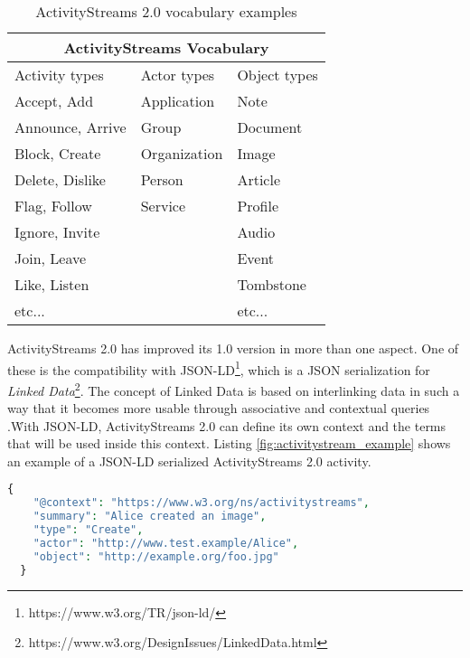 \begin{table}[H]
  \centering
  \begin{tabular}{|p{4cm}|p{4cm}|p{4cm}| }
    \hline
    \multicolumn{3}{|c|}{ActivityStreams Vocabulary} \\
    \hline
    Activity types & Actor types & Object types \\
    \hline
    \hline
      Accept, Add & Application & Note \\
      Announce, Arrive & Group & Document \\ 
      Block, Create & Organization & Image \\
      Delete, Dislike & Person & Article \\
      Flag, Follow & Service & Profile \\
      Ignore, Invite & & Audio \\
      Join, Leave & & Event \\
      Like, Listen & & Tombstone \\
      etc... & & etc... \\
      \hline
  \end{tabular}
  \caption{ActivityStreams 2.0 vocabulary examples}
  \label{table:activitystreams_vocabulary}
\end{table}

ActivityStreams 2.0 has improved its 1.0 version in more than one aspect. One of these is the compatibility with JSON-LD\footnote{https://www.w3.org/TR/json-ld/}, which is a JSON serialization for \emph{Linked Data}\footnote{https://www.w3.org/DesignIssues/LinkedData.html}. The concept of Linked Data is based on interlinking data in such a way that it becomes more usable through associative and contextual queries \cite{berners-lee_2006}.\. With JSON-LD, ActivityStreams 2.0 can define its own context and the terms that will be used inside this context. Listing \ref{fig:activitystream_example} shows an example of a JSON-LD serialized ActivityStreams 2.0 activity. 

\lstset{style=JSONStyle}
\begin{lstlisting}[language=PHP, caption=Example of a Create activity using JSON-LD \cite{snell_prodromou_2017}, label=fig:activitystream_example, float=h]
  {
    "@context": "https://www.w3.org/ns/activitystreams",
    "summary": "Alice created an image",
    "type": "Create",
    "actor": "http://www.test.example/Alice",
    "object": "http://example.org/foo.jpg"
  }
\end{lstlisting}

